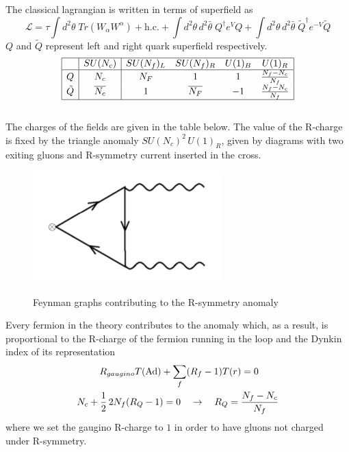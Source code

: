 The classical lagrangian is written in terms of superfield as
\begin{equation}
 \mathcal{L} = \tau \int d^2 \theta \; Tr ( W_{\alpha} W^{\alpha} ) + \mathrm{h.c.} + 
 \int d^2 \theta \, d^2 \bar{\theta} \;  {Q}^{\dagger} e^{ V} Q +
 \int d^2 \theta \, d^2 \bar{\theta} \; {\tilde{Q}^{\dagger}} e^{- V} \tilde{Q}
 \end{equation} 
$Q$ and $\tilde{Q}$ represent left and right quark superfield respectively.
\begin{equation}
 \begin{array}{| c | c |  c c c c |}
 \hline
 & SU(N_c) & SU(N_f)_L  &SU(N_f)_R   & U(1)_B &  U(1)_R \\
\hline
Q & N_c & N_F & 1   &  1  &  \frac{N_f - N_c}{N_f}  \\
\tilde{Q} &\overline{N_c}  &  1 & \overline{ N_F}   & -1   &  \frac{N_f - N_c}{N_f}   \\	 
\hline
 \end{array} 
 \label{tab:suN_elect_charge}
\end{equation}
\\
The charges of the fields are given in the table below.
The value of the R-charge is fixed by the triangle anomaly $SU(N_c)^2 \, U(1)_R $, given by diagrams with two exiting gluons and R-symmetry current inserted in the cross.
\begin{figure}
\centering
\includegraphics[scale=0.6]{r-symm_anomlay.png}
\label{fig:r_symm_triangle_anom}
\caption{Feynman graphs contributing to the R-symmetry anomaly}

\end{figure}
Every fermion in the theory contributes to the anomaly which, as a result, is proportional to the R-charge of the fermion running in the loop and the Dynkin index of its representation
\begin{align}
R_{gaugino} T (\hbox{Ad}) + \sum_{ f} (& R_{f} - 1)  T(r)   = 0 
\label{eqn:r_symm_anom_condition}
\\
N_c + \frac{1}{2}\,  2 N_f (R_Q -1)  = 0 \quad & \rightarrow \quad R_Q = \frac{N_f - N_c}{N_f}
\end{align}
where we set the gaugino R-charge to $1$ in order to have gluons not charged under R-symmetry.

